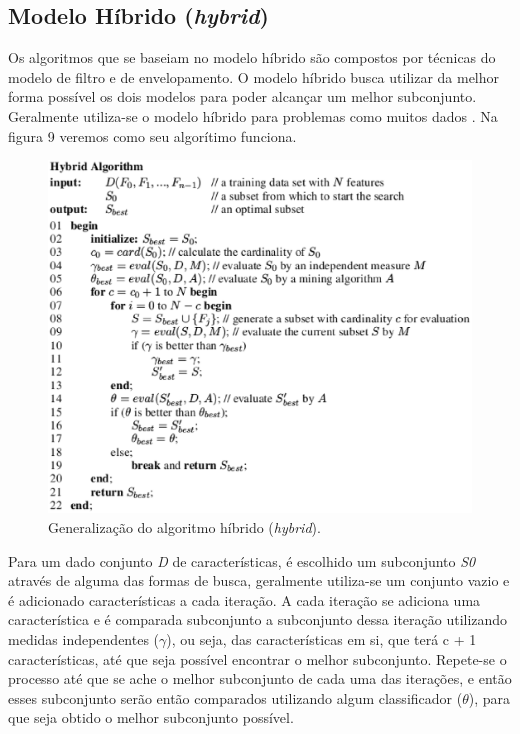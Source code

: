 \subsection{Modelo Híbrido (\textit{hybrid})}

Os algoritmos que se baseiam no modelo híbrido são compostos por técnicas do modelo de filtro e de envelopamento. O modelo híbrido busca utilizar da melhor forma possível os dois modelos para poder alcançar um melhor subconjunto. Geralmente utiliza-se o modelo híbrido para problemas como muitos dados \cite{liu_2005}. Na figura 9 veremos como seu algorítimo funciona.

\begin{figure}[h]
	\centering
	\label{fig09}
		\includegraphics[keepaspectratio=true,scale=0.7]{figuras/fig09.eps}
	\caption{Generalização do algoritmo híbrido (\textit{hybrid}). \cite{liu_2005}}
\end{figure}

Para um dado conjunto \textit{D} de características, é escolhido um subconjunto \textit{S0} através de alguma das formas de busca, geralmente utiliza-se um conjunto vazio e é adicionado características a cada iteração. A cada iteração se adiciona uma característica e é comparada subconjunto a subconjunto dessa iteração utilizando medidas independentes ($\gamma$), ou seja, das características em si, que terá c + 1 características, até que seja possível encontrar o melhor subconjunto. Repete-se o processo até que se ache o melhor subconjunto de cada uma das iterações, e então esses subconjunto serão então comparados utilizando algum classificador ($\theta$), para que seja obtido o melhor subconjunto possível. \cite{liu_2005}

